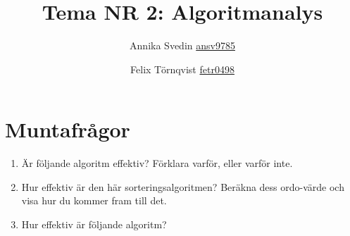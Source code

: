 \documentclass[a5paper,10pt,oneside]{article}
\title{Tema NR 2: Algoritmanalys}
\author{Annika Svedin \url{ansv9785} \and Felix Törnqvist \url{fetr0498}}
\begin{document}
\maketitle

\section*{Muntafrågor}

\begin{enumerate}

\item Är följande algoritm effektiv? Förklara varför, eller varför inte. 




\item Hur effektiv är den här sorteringsalgoritmen? Beräkna dess ordo-värde och visa hur du kommer fram till det.




\item Hur effektiv är följande algoritm?






\end{enumerate}
\end{document}
